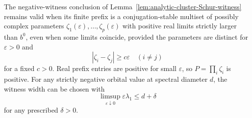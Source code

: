 \begin{lemma}
\label{lem:analytic-coalescent-prefix-isolation}
The negative-witness conclusion of
Lemma~\ref{lem:analytic-cluster-Schur-witness} remains valid when its
finite prefix is a conjugation-stable multiset of possibly complex
parameters $\zeta_1(\varepsilon),\ldots,\zeta_p(\varepsilon)$ with
positive real limits strictly larger than $b^0$, even when some limits
coincide, provided the parameters are distinct for $\varepsilon>0$ and
\[
                 |\zeta_i-\zeta_j|\ge c\varepsilon
                         \quad(i\ne j)
\]
for a fixed $c>0$. Real prefix entries are positive for small
$\varepsilon$, so $P=\prod_i\zeta_i$ is positive. For any strictly
negative orbital value at spectral diameter $d$, the witness width
can be chosen with
\[
                   \limsup_{\varepsilon\downarrow0}
                               \varepsilon\lambda_1\le d+\delta
\]
for any prescribed $\delta>0$.
\end{lemma}

